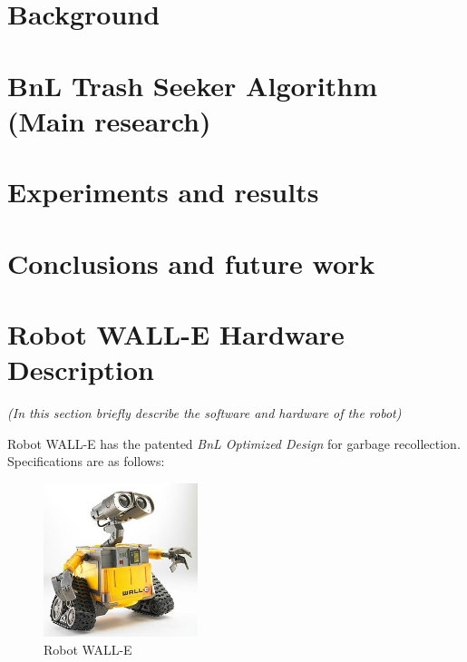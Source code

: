 \documentclass[runningheads,a4paper]{llncs}
\begin{document}
\section{Background}
\lipsum[1-3]

\section{BnL Trash Seeker Algorithm (Main research)}
\lipsum[4-14]

\section{Experiments and results}
\lipsum[15-20]

\section{Conclusions and future work}
\lipsum[21-24]

\section*{Robot WALL-E Hardware Description}
\textit{(In this section briefly describe the software and hardware of the robot)}

Robot WALL-E has the patented \textit{BnL Optimized Design} for garbage recollection. Specifications are as follows:

\begin{figure}
	\centering
	\includegraphics[width=0.4\textwidth]{images/wall-e.jpg}
	\caption{Robot WALL-E}
	\label{fig:virbot}
\end{figure}
\end{document}
